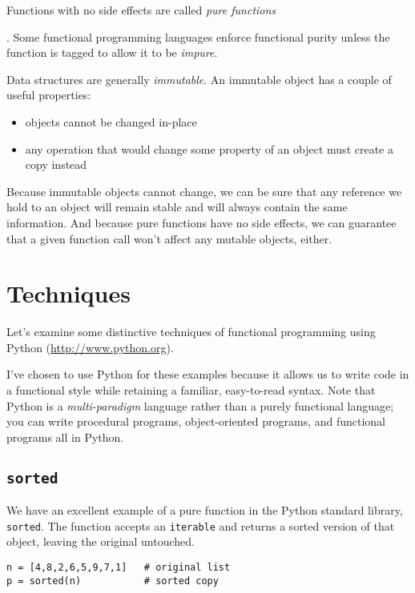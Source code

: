 \documentclass[ignorenonframetext,red]{beamer}
\begin{document}
\begin{frame}
Functions with no side effects are called \textit{pure functions}%
\end{frame}.
Some functional programming languages enforce functional purity unless the function is tagged to allow it to be \textit{impure}.
\begin{frame}%
Data structures are generally \textit{immutable}. An immutable object has a couple of useful properties:
\begin{itemize}
\pause \item objects cannot be changed in-place
\pause \item any operation that would change some property of an object must create a copy instead
\end{itemize}
\end{frame}
\noindent Because immutable objects cannot change, we can be sure that any reference we hold to an object will remain stable and will always contain the same information. And because pure functions have no side effects, we can guarantee that a given function call won't affect any mutable objects, either.

\section{Techniques}
\begin{frame}
Let's examine some distinctive techniques of functional programming using Python (\url{http://www.python.org}).
\end{frame}%
I've chosen to use Python for these examples because it allows us to write code in a functional style while retaining a familiar, easy-to-read syntax. Note that Python is a \textit{multi-paradigm} language rather than a purely functional language; you can write procedural programs, object-oriented programs, and functional programs all in Python.

\subsection{\tt sorted}
We have an excellent example of a pure function in the Python standard library, \texttt{sorted}. The function accepts an \texttt{iterable} and returns a sorted version of that object, leaving the original untouched.

\begin{frame}[fragile]
\begin{lstlisting}[style=python,caption={Sorting a List},label={lst:sorted}]
n = [4,8,2,6,5,9,7,1]   # original list
p = sorted(n)           # sorted copy
\end{lstlisting}
\end{frame}
\end{document}
